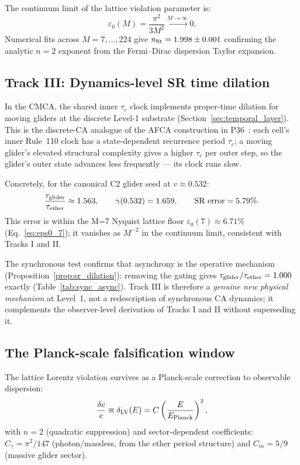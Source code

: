 \documentclass[11pt]{article}
\theoremstyle{remark}
\newcommand{\epsz}{\varepsilon_0}
\begin{document}
The continuum limit of the lattice violation parameter is:
\begin{equation}
  \label{eq:continuum_limit}
  \epsz(M) = \frac{\pi^2}{3M^2} \xrightarrow{M\to\infty} 0.
\end{equation}
Numerical fits across $M=7,\ldots,224$ give $n_{\rm fit}=1.998\pm0.001$
confirming the analytic $n=2$ exponent from the Fermi--Dirac dispersion
Taylor expansion.

\subsection{Track III: Dynamics-level SR time dilation}
\label{ssec:track3}

In the CMCA, the shared inner $\tau_c$ clock implements proper-time dilation
for moving gliders at the discrete Level-1 substrate (Section~\ref{sec:temporal_layer}).
This is the discrete-CA analogue of the AFCA construction in
P36~\cite{SpivackEmergentGravity}: each cell's inner Rule~110 clock has a
state-dependent recurrence period $\tau_c$; a moving glider's elevated structural
complexity gives a higher $\tau_c$ per outer step, so the glider's outer state
advances less frequently --- its clock runs slow.

Concretely, for the canonical C2 glider seed at $v\approx0.532$:
\begin{equation}
  \frac{\tau_{\rm glider}}{\tau_{\rm ether}} \approx 1.563,
  \qquad
  \gamma(0.532) = 1.659,
  \qquad
  \text{SR error} = 5.79\%.
\end{equation}
This error is within the M=7 Nyquist lattice floor $\epsz(7)\approx6.71\%$
(Eq.~\eqref{eq:eps0_7}); it vanishes as $M^{-2}$ in the continuum limit,
consistent with Tracks I and II.

The synchronous test confirms that asynchrony is the operative mechanism
(Proposition~\ref{prop:sr_dilation}): removing the gating gives
$\tau_{\rm glider}/\tau_{\rm ether}=1.000$ exactly (Table~\ref{tab:sync_async}).
Track III is therefore a \emph{genuine new physical mechanism} at Level~1,
not a redescription of synchronous CA dynamics; it complements the
observer-level derivation of Tracks I and II without superseding it.

\subsection{The Planck-scale falsification window}
\label{ssec:planck}

The lattice Lorentz violation survives as a Planck-scale correction to
observable dispersion:
\begin{equation}
  \label{eq:planck_lv}
  \frac{\delta c}{c} \equiv \delta_{\rm LV}(E)
  = C\left(\frac{E}{E_{\rm Planck}}\right)^2,
\end{equation}
with $n=2$ (quadratic suppression) and sector-dependent coefficients:
$C_\gamma = \pi^2/147$ (photon/massless, from the ether period structure)
and $C_m = 5/9$ (massive glider sector).
\end{document}
